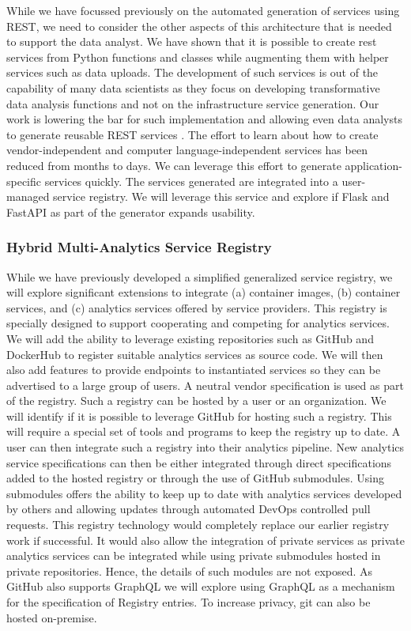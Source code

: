 While we have focussed previously on the automated generation of
services using REST, we need to consider the other aspects of this
architecture that is needed to support the data analyst.  We have
shown that it is possible to create rest services from Python
functions and classes while augmenting them with helper services such
as data uploads. The development of such services is out of the
capability of many data scientists as they focus on developing
transformative data analysis functions and not on the infrastructure
service generation. Our work is lowering the bar for such
implementation and allowing even data analysts to generate reusable
REST services \cite{las21openapi}. The effort to learn about how to
create vendor-independent and computer language-independent services
has been reduced from months to days. We can leverage this effort to
generate application-specific services quickly. The services generated
are integrated into a user-managed service registry. We will leverage
this service and explore if Flask and FastAPI as part
of the generator expands usability.

\subsubsection{Hybrid Multi-Analytics Service Registry}

While we have previously developed a simplified generalized service
registry, we will explore significant extensions to integrate (a)
container images, (b) container services, and (c) analytics 
services offered by service providers. This registry is specially
designed to support cooperating and competing for analytics services.
We will add the ability to leverage existing repositories such as
GitHub and DockerHub to register suitable analytics services as source
code. We will then also add features to provide endpoints to
instantiated services so they can be advertised to a large group of
users.  A neutral vendor specification is used as part of the
registry. Such a registry can be hosted by a user or an
organization. We will identify if it is possible to leverage GitHub
for hosting such a registry. This will require a special set of tools
and programs to keep the registry up to date. A user can then
integrate such a registry into their analytics pipeline. New analytics
service specifications can then be either integrated through direct
specifications added to the hosted registry or through the use of
GitHub submodules. Using submodules offers the ability to keep up to
date with analytics services developed by others and allowing updates
through automated DevOps controlled pull requests. This registry
technology would completely replace our earlier registry work if
successful. It would also allow the integration of private services as
private analytics services can be integrated while using private
submodules hosted in private repositories. Hence, the details of such
modules are not exposed. As GitHub also supports GraphQL we will
explore using GraphQL as a mechanism for the specification of Registry
entries. To increase privacy, git can also be hosted on-premise.

